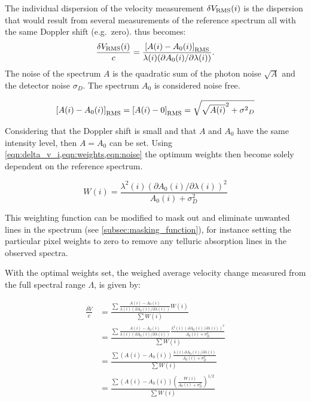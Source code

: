 The individual dispersion of the velocity measurement \(\delta V_{\textrm{RMS}}(i)\) is the dispersion that would result from several measurements of the reference spectrum all with the same Doppler shift (e.g.\ zero).
 thus becomes:
\begin{equation}
\frac{\delta V_{\textrm{RMS}}(i)}{c} = \frac{{[A(i) - {A}_{0}(i)]}_{\textrm{RMS}} }{\lambda(i) (\partial {A}_{0}(i)/\partial \lambda(i))}.
\label{eqn:delta_v_i_rms}
\end{equation}
The noise of the spectrum \(A\) is the quadratic sum of the photon noise \(\sqrt{A}\) and the detector noise \({\sigma}_{D}\).
The spectrum \({A}_{0}\) is considered noise free.

\begin{equation}
{[{A(i)-{A}_{0}(i)}]}_{\textrm{RMS}} = {[{A(i)} - 0]}_{\textrm{RMS}} = \sqrt{{\sqrt{A(i)}}^{2} + {{\sigma}^{2}}_{D}} \label{eqn:noise}
\end{equation}

Considering that the Doppler shift is small and that \(A\) and \({A}_{0}\) have the same intensity level, then \(A = {A}_{0}\) can be set.
Using \cref{eqn:delta_v_i,eqn:weights,eqn:noise} the optimum weights then become solely dependent on the reference spectrum.

\begin{equation}
W(i) = \frac{{\lambda}^{2}(i) {({\partial {A}_{0}(i)}/{\partial \lambda(i)})}^{2}}{A_0(i) + {\sigma}^{2}_{D}} \label{eqn:optimal_weight}
\end{equation}

This weighting function can be modified to mask out and eliminate unwanted lines in the spectrum (see \cref{subsec:masking_function}), for instance setting the particular pixel weights to zero to remove any telluric absorption lines in the observed spectra.

With the optimal weights set, the weighed average velocity change measured from the full spectral range \(\Lambda\), is given by:

\begin{align}
\frac{\overline{\delta V}}{c} &= \frac{
    \sum{
        \frac
        {A(i) - {A}_{0}(i)}{
            \lambda(i) \left({\partial {A}_{0}(i)}/{\partial \lambda(i)}\right)} W(i)}
}
{\sum{{W(i)}}} \\
&= \frac{
    \sum {
        \frac
        {A(i) - {A}_{0}(i)}
        {\lambda(i) (\partial {A}_{0}(i)/\partial \lambda(i))}
        \frac
        {{\lambda}^{2}(i) {({\partial {A}_{0}(i)}/{\partial \lambda(i)})}^{2}}
        {A_{0}(i) + {\sigma}^{2}_{D}}
    }
}
{\sum{{W(i)}}} \\
&= \frac{
    \sum { 
        (A(i) - {A}_{0}(i))
        \frac
        {\lambda(i) {\partial {A}_{0}(i)}/{\partial \lambda(i)}}
        {A_{0}(i) + {\sigma}^{2}_{D}}
    }
}
{\sum{{W(i)}}} \\
&= \frac{\sum{(A(i) - {A}_{0}(i)){\left(\frac{W(i)}{{A}_{0}(i) +{\sigma}_{D}^{2}}\right)}^{1/2}}}{\sum{W(i)}}
\label{eqn:delta_v_eqarray}
\end{align}

